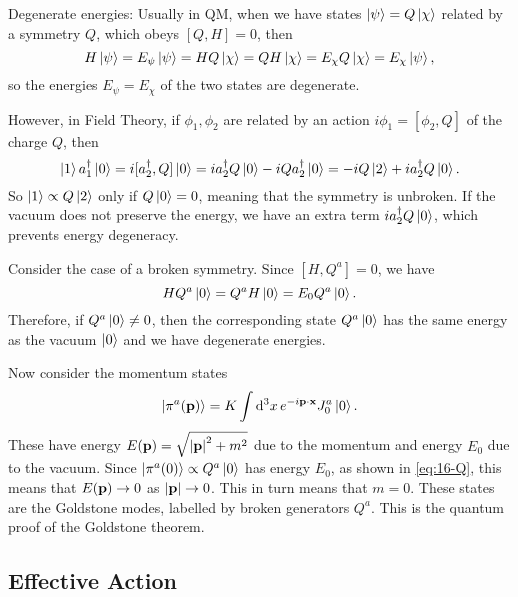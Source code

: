 Degenerate energies: Usually in QM, when we have states $\ket{\psi} = Q \ket{\chi}$ related by a symmetry $Q$, which obeys $[Q, H] = 0$, then
\begin{equation}
  H \ket{\psi} = E_{\psi} \ket{\psi} = H Q \ket{\chi} = Q H \ket{\chi} = E_{\chi} Q \ket{\chi} = E_\chi \ket{\psi},
\end{equation}
so the energies $E_{\psi} = E_{\chi}$ of the two states are degenerate.

However, in Field Theory, if $\phi_1, \phi_2$ are related by an action $i \phi_1 = [\phi_2, Q]$ of the charge $Q$, then
\begin{equation}
  \ket{1} a_1^{\dagger} \ket{0} = i [a_2^{\dagger}, Q] \ket{0} = i a_2^{\dagger} Q \ket{0}-i Q a_2^{\dagger} \ket{0} = -i Q \ket{2} + i a_2^{\dagger} Q \ket{0}.
\end{equation}
So $\ket{1} \propto Q \ket{2}$ only if $Q \ket{0} = 0$, meaning that the symmetry is unbroken.
If the vacuum does not preserve the energy, we have an extra term $i a_2^{\dagger} Q \ket{0}$, which prevents energy degeneracy.

Consider the case of a broken symmetry. Since $[H, Q^{a}] = 0$, we have 
\begin{equation}
  \label{eq:16-Q}
  H Q^{a} \ket{0} = Q^{a} H \ket{0} = E_0 Q^{a} \ket{0}.
\end{equation}
Therefore, if $Q^{a} \ket{0} \neq 0$, then the corresponding state $Q^{a} \ket{0}$ has the same energy as the vacuum $\ket{0}$ and we have degenerate energies.

Now consider the momentum states
\begin{equation}
  \ket{\pi^{a} (\vb{p})} = K \int \dd[3]{x} e^{-i \vb{p} \cdot \vb{x}} J_0^{a} \ket{0}.
\end{equation}
These have energy $E(\vb{p}) = \sqrt{\abs{\vb{p}}^2 + m^2}$ due to the momentum and energy $E_0$ due to the vacuum.
Since $\ket{\pi^{a} (0)} \propto Q^{a}\ket{0}$ has energy $E_0$, as shown in \eqref{eq:16-Q}, this means that $E(\vb{p}) \to 0$ as $\abs{\vb{p}} \to 0$. This in turn means that $m = 0$.
These states are the Goldstone modes, labelled by broken generators $Q^{a}$.
This is the quantum proof of the Goldstone theorem.

\subsection*{Effective Action}%

